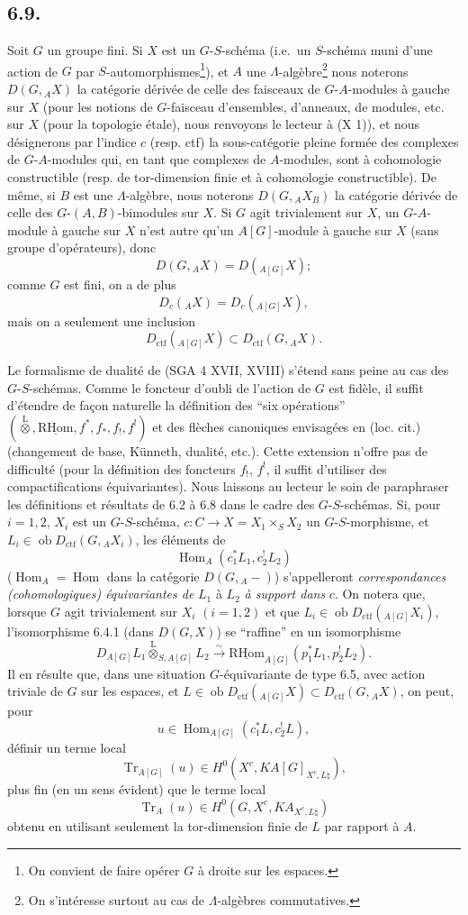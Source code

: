 \documentclass[11pt]{article}
\DeclareMathOperator{\Hom}{Hom}
\newcommand{\R}{\mathrm{R}}\newcommand{\RHomCore}{\mathrm{RHom}}
\providecommand{\RHom}{\RHomCore}
\providecommand{\uRHom}{\underline{\RHom}}
\providecommand{\Tr}{\operatorname{Tr}}
\providecommand{\Tr}{\operatorname{Tr}}
\providecommand{\lten}{\overset{\mathrm L}{\otimes}}
\providecommand{\Ob}{\operatorname{ob}}
\providecommand{\Tr}{\operatorname{Tr}}
\providecommand{\RHom}{\RHomCore}
\providecommand{\Hom}{\operatorname{Hom}}
\providecommand{\lten}{\overset{\mathrm L}{\otimes}}
\providecommand{\RHom}{\R\mathcal{H}om}
\providecommand{\lten}{\overset{\mathrm L}{\otimes}}
\providecommand{\Ob}{\operatorname{ob}}
\providecommand{\R}{\mathrm R}
\providecommand{\Tr}{\operatorname{Tr}}
\providecommand{\lten}{\overset{\mathrm L}{\otimes}}
\providecommand{\lten}{\overset{\mathrm L}{\otimes}}
\providecommand{\Ob}{\operatorname{Ob}}
\providecommand{\lten}{\overset{\mathrm L}{\otimes}}
\providecommand{\RHom}{\RHomCore}
\providecommand{\Hom}{\operatorname{Hom}}
\providecommand{\Tr}{\operatorname{Tr}}
\providecommand{\Ob}{\operatorname{ob}}
\providecommand{\Ob}{\operatorname{Ob}}
\providecommand{\lten}{\overset{\mathrm L}{\otimes}}
\begin{document}
\subsection*{6.9.}
Soit $G$ un groupe fini. Si $X$ est un $G$-$S$-schéma (i.e.~un $S$-schéma muni d'une action de $G$ par $S$-automorphismes\footnote{On convient de faire opérer $G$ à droite sur les espaces.}), et $A$ une $\Lambda$-algèbre\footnote{On s'intéresse surtout au cas de $\Lambda$-algèbres commutatives.} nous noterons $D(G,{}_AX)$ la catégorie dérivée de celle des faisceaux de $G$-$A$-modules à gauche sur $X$ (pour les notions de $G$-faisceau d'ensembles, d'anneaux, de modules, etc. sur $X$ (pour la topologie étale), nous renvoyons le lecteur à (X 1)), et nous
désignerons par l'indice $c$ (resp. ctf) la sous-catégorie pleine formée des complexes de $G$-$A$-modules qui, en tant que complexes de $A$-modules, sont à cohomologie constructible (resp. de tor-dimension finie et à cohomologie constructible). De même, si $B$ est une $\Lambda$-algèbre, nous noterons $D(G,{}_AX_B)$ la catégorie dérivée de celle des $G$-$(A,B)$-bimodules sur $X$. Si $G$ agit trivialement sur $X$, un $G$-$A$-module à gauche sur $X$ n'est autre qu'un $A[G]$-module à gauche sur $X$ (sans groupe d'opérateurs), donc
\[
D(G,{}_AX)=D({}_{A[G]}X);
\]
comme $G$ est fini, on a de plus
\[
D_c({}_AX)=D_c({}_{A[G]}X),
\]
mais on a seulement une inclusion
\[
D_{\mathrm{ctf}}({}_{A[G]}X)\subset D_{\mathrm{ctf}}(G,{}_AX).
\]

Le formalisme de dualité de (SGA 4 XVII, XVIII) s'étend sans peine au cas des $G$-$S$-schémas. Comme le foncteur d'oubli de l'action de $G$ est fidèle, il suffit d'étendre de façon naturelle la définition des ``six opérations'' $(\lten,\uRHom,f^*,f_*,f_!,f^!)$ et des flèches canoniques envisagées en (loc. cit.) (changement de base, Künneth, dualité, etc.). Cette extension n'offre pas de difficulté (pour la définition des foncteurs $f_!$, $f^!$, il suffit d'utiliser des compactifications équivariantes). Nous laissons au lecteur le soin de paraphraser les définitions et résultats de 6.2 à 6.8 dans le cadre des $G$-$S$-schémas. Si, pour $i=1,2$, $X_i$ est un $G$-$S$-schéma, $c:C\to X=X_1\times_SX_2$ un $G$-$S$-morphisme, et $L_i\in\Ob D_{\mathrm{ctf}}(G,{}_AX_i)$, les éléments de
\[
\Hom_A(c_1^*L_1,c_2^!L_2)
\]
($\Hom_A=\Hom$ dans la catégorie $D(G,{}_A-)$) s'appelleront \emph{correspondances (cohomologiques) équivariantes de} $L_1$ à $L_2$ \emph{à support dans} $c$. On notera que, lorsque $G$ agit trivialement sur $X_i$ $(i=1,2)$ et que $L_i\in\Ob D_{\mathrm{ctf}}({}_{A[G]}X_i)$, l'isomorphisme 6.4.1 (dans $D(G,X)$) se ``raffine'' en un isomorphisme
\[
D_{A[G]}L_1\lten_{S,A[G]}L_2
\xrightarrow{\sim}
\uRHom_{A[G]}(p_1^*L_1,p_2^!L_2).
\]
Il en résulte que, dans une situation $G$-équivariante de type 6.5, avec action triviale de $G$ sur les espaces, et $L\in\Ob D_{\mathrm{ctf}}({}_{A[G]}X)\subset D_{\mathrm{ctf}}(G,{}_AX)$, on peut, pour
\[
u\in\Hom_{A[G]}(c_1^*L,c_2^!L),
\]
définir un terme local
\[
\Tr_{A[G]}(u)\in H^0(X^c,KA[G]_{X^c,L\natural}),
\]
plus fin (en un sens évident) que le terme local
\[
\Tr_A(u)\in H^0(G,X^c,KA_{X^c,L\natural})
\]
obtenu en utilisant seulement la tor-dimension finie de $L$ par rapport à $A$.
\end{document}
